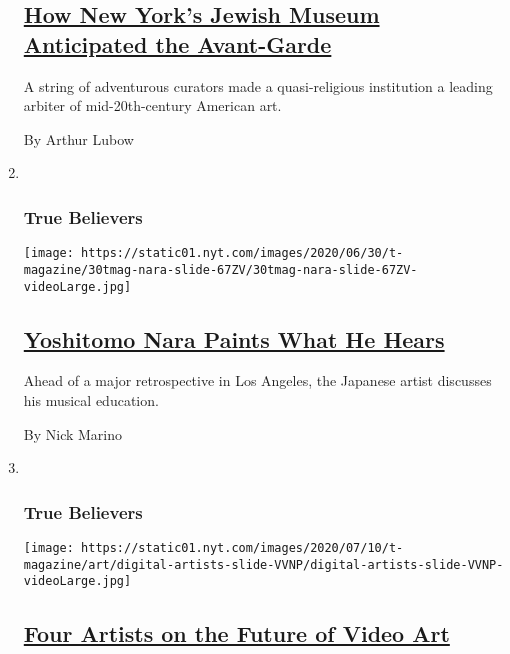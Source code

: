 \begin{enumerate}
  \hypertarget{how-new-yorks-jewish-museum-anticipated-the-avant-garde}{%
  \subsection{\texorpdfstring{\href{/2020/07/23/t-magazine/jewish-museum-new-york.html}{How
  New York's Jewish Museum Anticipated the
  Avant-Garde}}{How New York's Jewish Museum Anticipated the Avant-Garde}}\label{how-new-yorks-jewish-museum-anticipated-the-avant-garde}}

  A string of adventurous curators made a quasi-religious institution a
  leading arbiter of mid-20th-century American art.

  By Arthur Lubow
\item ~
  \hypertarget{true-believers-6}{%
  \subsubsection{True Believers}\label{true-believers-6}}

  \texttt{[image: https://static01.nyt.com/images/2020/06/30/t-magazine/30tmag-nara-slide-67ZV/30tmag-nara-slide-67ZV-videoLarge.jpg]}

  \hypertarget{yoshitomo-nara-paints-what-he-hears}{%
  \subsection{\texorpdfstring{\href{/2020/07/24/t-magazine/yoshitomo-nara.html}{Yoshitomo
  Nara Paints What He
  Hears}}{Yoshitomo Nara Paints What He Hears}}\label{yoshitomo-nara-paints-what-he-hears}}

  Ahead of a major retrospective in Los Angeles, the Japanese artist
  discusses his musical education.

  By Nick Marino
\item ~
  \hypertarget{true-believers-7}{%
  \subsubsection{True Believers}\label{true-believers-7}}

  \texttt{[image: https://static01.nyt.com/images/2020/07/10/t-magazine/art/digital-artists-slide-VVNP/digital-artists-slide-VVNP-videoLarge.jpg]}

  \hypertarget{four-artists-on-the-future-of-video-art}{%
  \subsection{\texorpdfstring{\href{/2020/07/22/t-magazine/video-art.html}{Four
  Artists on the Future of Video
  Art}}{Four Artists on the Future of Video Art}}\label{four-artists-on-the-future-of-video-art}}


\end{enumerate}
